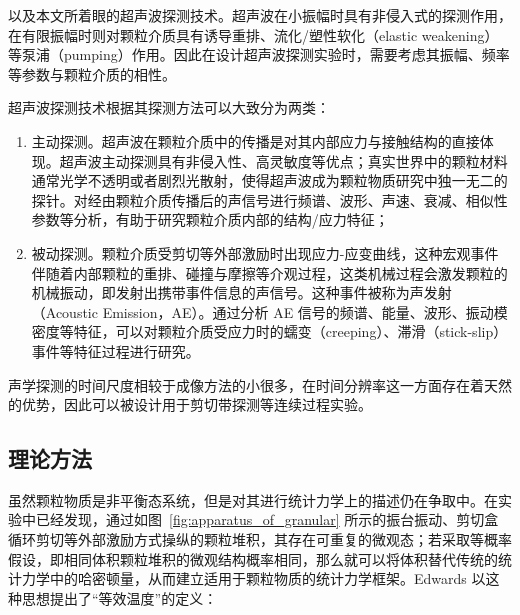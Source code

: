 以及本文所着眼的超声波探测技术。超声波在小振幅时具有非侵入式的探测作用，在有限振幅时则对颗粒介质具有诱导重排\cite{PhysRevE.84.020301}、流化/塑性软化（elastic weakening）\cite{PhysRevE.84.020301}等泵浦（pumping）作用。因此在设计超声波探测实验时，需要考虑其振幅、频率等参数与颗粒介质的相性。

超声波探测技术根据其探测方法可以大致分为两类：

\begin{enumerate}
  \item 主动探测。超声波在颗粒介质中的传播是对其内部应力与接触结构的直接体现\cite{PhysRevB.48.15646,Jia1999UltrasoundPI,Transitional}。超声波主动探测具有非侵入性、高灵敏度等优点；真实世界中的颗粒材料通常光学不透明或者剧烈光散射，使得超声波成为颗粒物质研究中独一无二的探针。对经由颗粒介质传播后的声信号进行频谱、波形、声速、衰减、相似性参数等分析，有助于研究颗粒介质内部的结构/应力特征；
  \item 被动探测。颗粒介质受剪切等外部激励时出现应力-应变曲线，这种宏观事件伴随着内部颗粒的重排、碰撞与摩擦等介观过程，这类机械过程会激发颗粒的机械振动，即发射出携带事件信息的声信号。这种事件被称为声发射（Acoustic Emission，AE）。通过分析 AE 信号的频谱、能量、波形、振动模密度等特征\cite{PhysRevLett.120.218003,10.1029/2023JB026612,doi:10.1073/pnas.2305134120}，可以对颗粒介质受应力时的蠕变（creeping）、滞滑（stick-slip）事件等特征过程进行研究。
\end{enumerate}

声学探测的时间尺度相较于成像方法的小很多，在时间分辨率这一方面存在着天然的优势\cite{PhysRevE.84.020301}，因此可以被设计用于剪切带探测\cite{PhysRevE.85.051302}等连续过程实验。


\subsection{理论方法}

虽然颗粒物质是非平衡态系统，但是对其进行统计力学上的描述仍在争取中。在实验中已经发现，通过如图~\eqref{fig:apparatus_of_granular} 所示的振台振动、剪切盒循环剪切等外部激励方式操纵的颗粒堆积，其存在可重复的微观态；若采取等概率假设，即相同体积颗粒堆积的微观结构概率相同，那么就可以将体积替代传统的统计力学中的哈密顿量，从而建立适用于颗粒物质的统计力学框架。Edwards 以这种思想提出了“等效温度”的定义\cite{EDWARDS19891080}：

